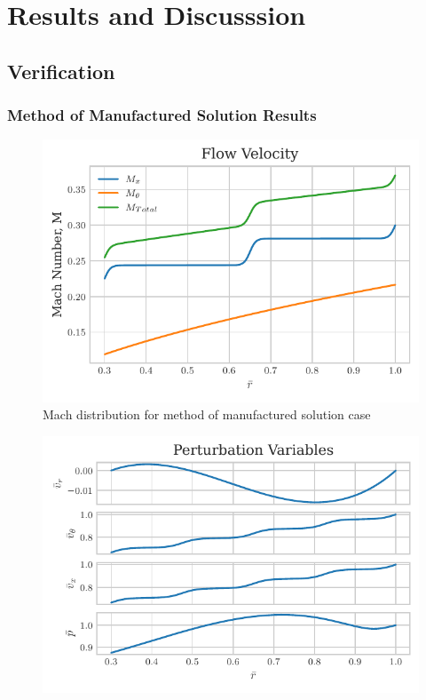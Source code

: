 \documentclass[12pt]{uthesis-v12}  %
\begin{document}
\chapter{Results and Discusssion}
\section{Verification}
\subsection{Method of Manufactured Solution Results}

\begin{figure}
    \centering
    \includegraphics[width=\textwidth]{Chapter-5-Results/tex-outputs/MachDistribution_R1.pdf}
    \caption{Mach distribution for method of manufactured solution case}
\end{figure}

 \begin{figure}
     \centering
     \includegraphics[width=\textwidth]{Chapter-5-Results/tex-outputs/PerturbationVariables_R1.pdf}
 \end{figure}
\end{document}
